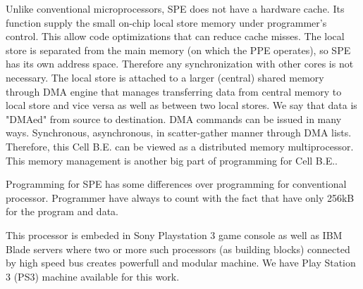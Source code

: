 \par
Unlike conventional microprocessors, SPE does not have a hardware cache.
Its function supply the small on-chip local store memory under programmer's control.
This allow code optimizations that can reduce cache misses.
The local store is separated from the main memory (on which the PPE operates), so SPE has its own address space.
Therefore any synchronization with other cores is not necessary.
The local store is attached to a larger (central) shared memory through DMA engine that manages transferring data from central memory to local store and vice versa as well as between two local stores.
We say that data is "DMAed" from source to destination.
DMA commands can be issued in many ways.
Synchronous, asynchronous, in scatter-gather manner through DMA lists.
Therefore, this Cell B.E. can be viewed as a distributed memory multiprocessor.
This memory management is another big part of programming for Cell B.E..

\par
Programming for SPE has some differences over programming for conventional processor.
Programmer have always to count with the fact that have only 256kB for the program and data.

\par
This processor is embeded in Sony Playstation 3 game console as well as IBM Blade servers where two or more such processors (as building blocks) connected by high speed bus creates powerfull and modular machine.
We have Play Station 3 (PS3) machine available for this work.